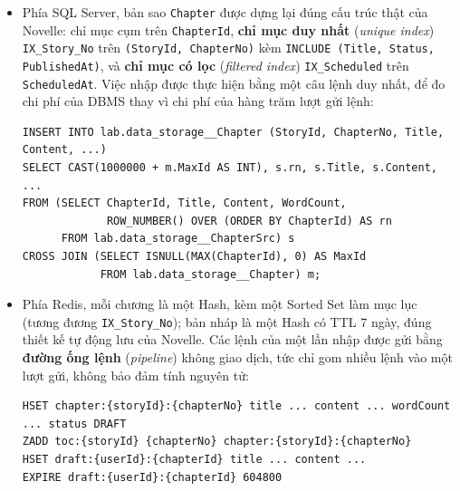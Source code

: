 \begin{itemize}
    \item Phía SQL Server, bản sao \texttt{Chapter} được dựng lại đúng cấu trúc thật của Novelle: chỉ mục cụm trên \texttt{ChapterId}, \textbf{chỉ mục duy nhất} (\textit{unique index}) \texttt{IX\_Story\_No} trên \texttt{(StoryId, ChapterNo)} kèm \texttt{INCLUDE (Title, Status, PublishedAt)}, và \textbf{chỉ mục có lọc} (\textit{filtered index}) \texttt{IX\_Scheduled} trên \texttt{ScheduledAt}. Việc nhập được thực hiện bằng một câu lệnh duy nhất, để đo chi phí của DBMS thay vì chi phí của hàng trăm lượt gửi lệnh:
\begin{verbatim}
INSERT INTO lab.data_storage__Chapter (StoryId, ChapterNo, Title, Content, ...)
SELECT CAST(1000000 + m.MaxId AS INT), s.rn, s.Title, s.Content, ...
FROM (SELECT ChapterId, Title, Content, WordCount,
             ROW_NUMBER() OVER (ORDER BY ChapterId) AS rn
      FROM lab.data_storage__ChapterSrc) s
CROSS JOIN (SELECT ISNULL(MAX(ChapterId), 0) AS MaxId
            FROM lab.data_storage__Chapter) m;
\end{verbatim}

\item Phía Redis, mỗi chương là một Hash, kèm một Sorted Set làm mục lục (tương đương \texttt{IX\_Story\_No}); bản nháp là một Hash có TTL 7 ngày, đúng thiết kế tự động lưu của Novelle. Các lệnh của một lần nhập được gửi bằng \textbf{đường ống lệnh} (\textit{pipeline}) không giao dịch, tức chỉ gom nhiều lệnh vào một lượt gửi, không bảo đảm tính nguyên tử:

\begin{verbatim}
HSET chapter:{storyId}:{chapterNo} title ... content ... wordCount ... status DRAFT
ZADD toc:{storyId} {chapterNo} chapter:{storyId}:{chapterNo}
HSET draft:{userId}:{chapterId} title ... content ...
EXPIRE draft:{userId}:{chapterId} 604800
\end{verbatim}
\end{itemize}

